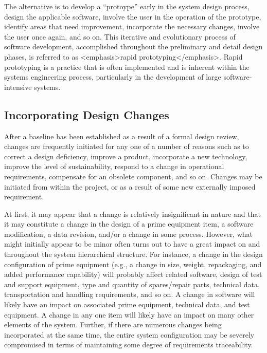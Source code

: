 The alternative is to develop a ``protoype'' early in the system design process, design the applicable software, involve the user in the operation of the prototype, identify areas that need improvement, incorporate the necessary changes, involve the user once again, and so on. This iterative and evolutionary process of software development, accomplished throughout the preliminary and detail design phases, is referred to as <emphasis>rapid prototyping</emphasis>. Rapid prototyping is a practice that is often implemented and is inherent within the systems engineering process, particularly in the development of large software-intensive systems.

\subsection{Incorporating Design Changes}

After a baseline has been established as a result of a formal design review, changes are frequently initiated for any one of a number of reasons such as to correct a design deficiency, improve a product, incorporate a new technology, improve the level of sustainability, respond to a change in operational requirements, compensate for an obsolete component, and so on. Changes may be initiated from within the project, or as a result of some new externally imposed requirement.

At first, it may appear that a change is relatively insignificant in nature and that it may constitute a change in the design of a prime equipment item, a software modification, a data revision, and/or a change in some process. However, what might initially appear to be minor often turns out to have a great impact on and throughout the system hierarchical structure. For instance, a change in the design configuration of prime equipment (e.g., a change in size, weight, repackaging, and added performance capability) will probably affect related software, design of test and support equipment, type and quantity of spares/repair parts, technical data, transportation and handling requirements, and so on. A change in software will likely have an impact on associated prime equipment, technical data, and test equipment. A change in any one item will likely have an impact on many other elements of the system. Further, if there are numerous changes being incorporated at the same time, the entire system configuration may be severely compromised in terms of maintaining some degree of requirements traceability.

